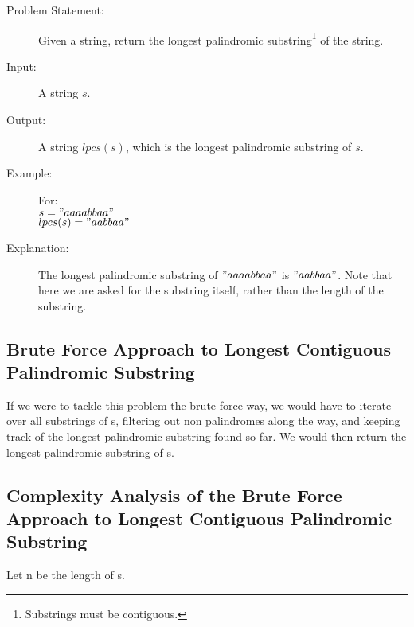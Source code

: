 \begin{description}
    \item[Problem Statement:]
        Given a string, return the longest palindromic substring\footnote{Substrings must be contiguous.} of the string.

    \item[Input:] 
        A string $s$.
        
    \item[Output:] 
        A string $lpcs(s)$, which is the longest palindromic substring of $s$.
        
    \item[Example:] For:\\
        $s = "aaaabbaa"$\\
        $lpcs(s) = "aabbaa"$

    \item[Explanation:]
        The longest palindromic substring of $"aaaabbaa"$ is $"aabbaa"$.
        Note that here we are asked for the substring itself, rather than the length of the substring.
   
\end{description}

\subsection{Brute Force Approach to Longest Contiguous Palindromic Substring}
If we were to tackle this problem the brute force way, we would have to iterate over all substrings of s, filtering out non palindromes along the way,
and keeping track of the longest palindromic substring found so far. 
We would then return the longest palindromic substring of s.

\subsection{Complexity Analysis of the Brute Force Approach to Longest Contiguous Palindromic Substring}
Let n be the length of s.

